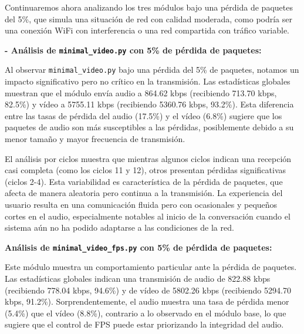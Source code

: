 Continuaremos ahora analizando los tres módulos bajo una pérdida de paquetes del 5\%, que simula una situación de red con calidad moderada, como podría ser una conexión WiFi con interferencia o una red compartida con tráfico variable.

\vspace{\baselineskip}

\textbf{- Análisis de \texttt{minimal\_video.py} con 5\% de pérdida de paquetes:}
\vspace{\baselineskip}

Al observar \texttt{minimal\_video.py} bajo una pérdida del 5\% de paquetes, notamos un impacto significativo pero no crítico en la transmisión. Las estadísticas globales muestran que el módulo envía audio a 864.62 kbps (recibiendo 713.70 kbps, 82.5\%) y vídeo a 5755.11 kbps (recibiendo 5360.76 kbps, 93.2\%). Esta diferencia entre las tasas de pérdida del audio (17.5\%) y el vídeo (6.8\%) sugiere que los paquetes de audio son más susceptibles a las pérdidas, posiblemente debido a su menor tamaño y mayor frecuencia de transmisión.
\vspace{\baselineskip}

El análisis por ciclos muestra que mientras algunos ciclos indican una recepción casi completa (como los ciclos 11 y 12), otros presentan pérdidas significativas (ciclos 2-4). Esta variabilidad es característica de la pérdida de paquetes, que afecta de manera aleatoria pero continua a la transmisión. La experiencia del usuario resulta en una comunicación fluida pero con ocasionales y pequeños cortes en el audio, especialmente notables al inicio de la conversación cuando el sistema aún no ha podido adaptarse a las condiciones de la red.

\vspace{\baselineskip}

\textbf{Análisis de \texttt{minimal\_video\_fps.py} con 5\% de pérdida de paquetes:}
\vspace{\baselineskip}

Este módulo muestra un comportamiento particular ante la pérdida de paquetes. Las estadísticas globales indican una transmisión de audio de 822.88 kbps (recibiendo 778.04 kbps, 94.6\%) y de vídeo de 5802.26 kbps (recibiendo 5294.70 kbps, 91.2\%). Sorprendentemente, el audio muestra una tasa de pérdida menor (5.4\%) que el vídeo (8.8\%), contrario a lo observado en el módulo base, lo que sugiere que el control de FPS puede estar priorizando la integridad del audio.
\vspace{\baselineskip}

